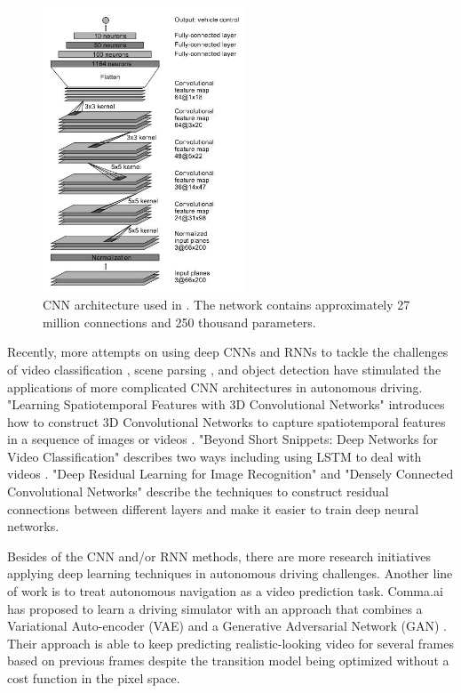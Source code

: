\documentclass[10pt,twocolumn,letterpaper]{article}
\begin{document}
\begin{figure}[!htb]
	\includegraphics[width=6cm]{nvidiacnn}
	\centering
	\caption{CNN architecture used in \cite{bojarski2016end}. The network contains approximately 27 million connections and 250 thousand parameters.}
	\label{nvidiaimage}
\end{figure}

Recently, more attempts on using deep CNNs and RNNs to tackle the challenges of video classification \cite{karpathy2014large}, scene parsing \cite{farabet2013learning}, and object detection \cite{szegedy2013deep} have stimulated the applications of more complicated CNN architectures in autonomous driving. "Learning Spatiotemporal Features with 3D Convolutional Networks" introduces how to construct 3D Convolutional Networks to capture spatiotemporal features in a sequence of images or videos \cite{Tran_2015_ICCV}. "Beyond Short Snippets: Deep Networks for Video Classification" describes two ways including using LSTM to deal with videos \cite{yue2015beyond}. "Deep Residual Learning for Image Recognition" \cite{he2016deep} and "Densely Connected Convolutional Networks" \cite{huang2016densely} describe the techniques to construct residual connections between different layers and make it easier to train deep neural networks.

Besides of the CNN and/or RNN methods, there are more research initiatives applying deep learning techniques in autonomous driving challenges. Another line of work is to treat autonomous navigation as a video prediction task. Comma.ai \cite{santana2016learning} has proposed to learn a driving simulator with an approach that combines a Variational Auto-encoder (VAE) \cite{kingma2013auto} and a Generative Adversarial Network (GAN) \cite{goodfellow2014generative}. Their approach is able to keep predicting realistic-looking video for several frames based on previous frames despite the transition model being optimized without a cost function in the pixel space. 
\end{document}
